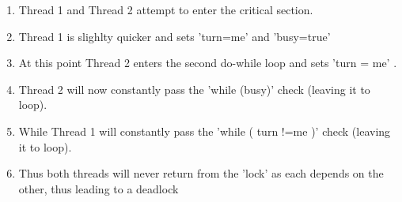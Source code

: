 \begin{enumerate}
\item Thread 1 and Thread 2 attempt to enter the critical section.
\item Thread 1 is slighlty quicker and sets 'turn=me' and 'busy=true'
\item At this point Thread 2 enters the second do-while loop and sets 'turn = me' .
\item Thread 2 will now constantly pass the 'while (busy)' check (leaving it to loop).
\item While Thread 1 will constantly pass the 'while ( turn !=me )' check (leaving it to loop).
\item Thus both threads will never return from the 'lock' as each depends on the other, thus leading to a deadlock
\end{enumerate}
